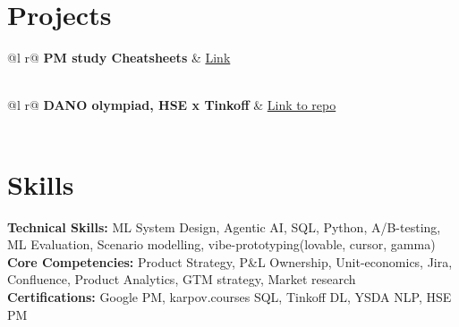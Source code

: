 \documentclass[a4paper,12pt]{article}
\begin{document}
\section{Projects}

\begin{tabularx}{\linewidth}{ @{}l r@{} }
\textbf{PM study Cheatsheets} & \hfill \href{https://slavikss.github.io/blog}{Link} \\[3.75pt]
  \\
\end{tabularx}

\begin{tabularx}{\linewidth}{ @{}l r@{} }
\textbf{DANO olympiad, HSE x Tinkoff} & \hfill \href{https://github.com/Slavikss/tinkoff-cinema-tickets}{Link to repo} \\[3.75pt]
  \\
\end{tabularx}


\section{Skills}
\textbf{Technical Skills:} ML System Design, Agentic AI, SQL, Python, A/B-testing, ML Evaluation, Scenario modelling, vibe-prototyping(lovable, cursor, gamma) \\
\textbf{Core Competencies:} Product Strategy, P\&L Ownership, Unit-economics, Jira, Confluence, Product Analytics, GTM strategy, Market research \\
\textbf{Certifications:} Google PM, karpov.courses SQL, Tinkoff DL, YSDA NLP, HSE PM \\

\enlargethispage{-\baselineskip}
\end{document}
